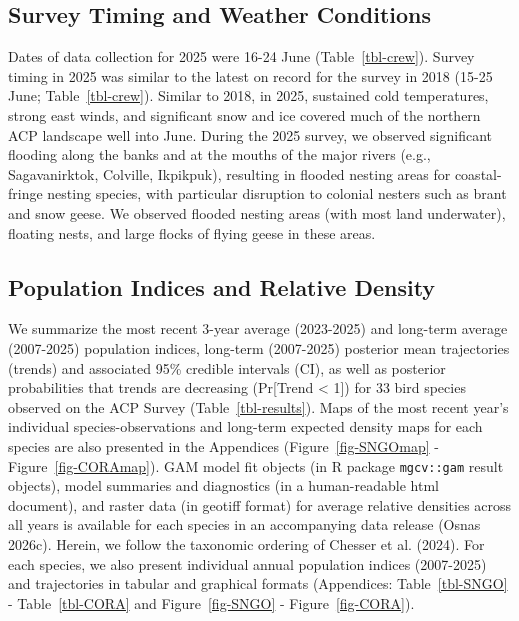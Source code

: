 \documentclass[
]{article}
\begin{document}
\subsection*{Survey Timing and Weather
Conditions}\label{survey-timing-and-weather-conditions-1}

Dates of data collection for 2025 were 16-24 June
(Table~\ref{tbl-crew}). Survey timing in 2025 was similar to the latest
on record for the survey in 2018 (15-25 June; Table~\ref{tbl-crew}).
Similar to 2018, in 2025, sustained cold temperatures, strong east
winds, and significant snow and ice covered much of the northern ACP
landscape well into June. During the 2025 survey, we observed
significant flooding along the banks and at the mouths of the major
rivers (e.g., Sagavanirktok, Colville, Ikpikpuk), resulting in flooded
nesting areas for coastal-fringe nesting species, with particular
disruption to colonial nesters such as brant and snow geese. We observed
flooded nesting areas (with most land underwater), floating nests, and
large flocks of flying geese in these areas.

\subsection*{Population Indices and Relative
Density}\label{population-indices-and-relative-density}

We summarize the most recent 3-year average (2023-2025) and long-term
average (2007-2025) population indices, long-term (2007-2025) posterior
mean trajectories (trends) and associated 95\% credible intervals (CI),
as well as posterior probabilities that trends are decreasing
(Pr{[}Trend \textless{} 1{]}) for 33 bird species observed on the ACP
Survey (Table~\ref{tbl-results}). Maps of the most recent year's
individual species-observations and long-term expected density maps for
each species are also presented in the Appendices
(Figure~\ref{fig-SNGOmap} - Figure~\ref{fig-CORAmap}). GAM model fit
objects (in R package \texttt{mgcv::gam} result objects), model
summaries and diagnostics (in a human-readable html document), and
raster data (in geotiff format) for average relative densities across
all years is available for each species in an accompanying data release
(Osnas 2026c). Herein, we follow the taxonomic ordering of Chesser et
al. (2024). For each species, we also present individual annual
population indices (2007-2025) and trajectories in tabular and graphical
formats (Appendices: Table~\ref{tbl-SNGO} - Table~\ref{tbl-CORA} and
Figure~\ref{fig-SNGO} - Figure~\ref{fig-CORA}).
\end{document}
